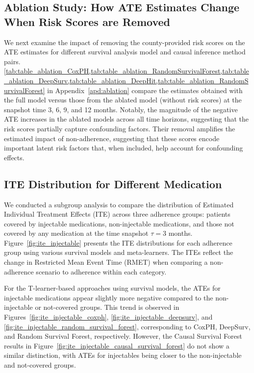\subsection{Ablation Study: How ATE Estimates Change When Risk Scores are Removed}
\label{sec:04_results_ablation}

We next examine the impact of removing the county-provided risk scores on the ATE estimates for different survival analysis model and causal inference method pairs. 
\cref{tab:table_ablation_CoxPH,tab:table_ablation_RandomSurvivalForest,tab:table_ablation_DeepSurv,tab:table_ablation_DeepHit,tab:table_ablation_RandomSurvivalForest} in Appendix~\ref{apd:ablation} compare the estimates obtained with the full model versus those from the ablated model (without risk scores) at the snapshot time 3, 6, 9, and 12 months. 
Notably, the magnitude of the negative ATE increases in the ablated models across all time horizons, suggesting that the risk scores partially capture confounding factors. 
Their removal amplifies the estimated impact of non-adherence, suggesting that these scores encode important latent risk factors that, when included, help account for confounding effects.

\subsection{ITE Distribution for Different Medication}
\label{sec:04_results_ite_analysis}

We conducted a subgroup analysis to compare the distribution of Estimated Individual Treatment Effects (ITE) across three adherence groups: patients covered by injectable medications, non-injectable medications, and those not covered by any medication at the time snapshot \(\tau=3\) months.
Figure~\ref{fig:ite_injectable} presents the ITE distributions for each adherence group using various survival models and meta-learners.
The ITEs reflect the change in Restricted Mean Event Time (RMET) when comparing a non-adherence scenario to adherence within each category.

For the T-learner-based approaches using survival models, the ATEs for injectable medications appear slightly more negative compared to the non-injectable or not-covered groups.
This trend is observed in Figures~\ref{fig:ite_injectable_coxph}, \ref{fig:ite_injectable_deepsurv}, and \ref{fig:ite_injectable_random_survival_forest}, corresponding to CoxPH, DeepSurv, and Random Survival Forest, respectively.
However, the Causal Survival Forest results in Figure~\ref{fig:ite_injectable_causal_survival_forest} do not show a similar distinction, with ATEs for injectables being closer to the non-injectable and not-covered groups.

